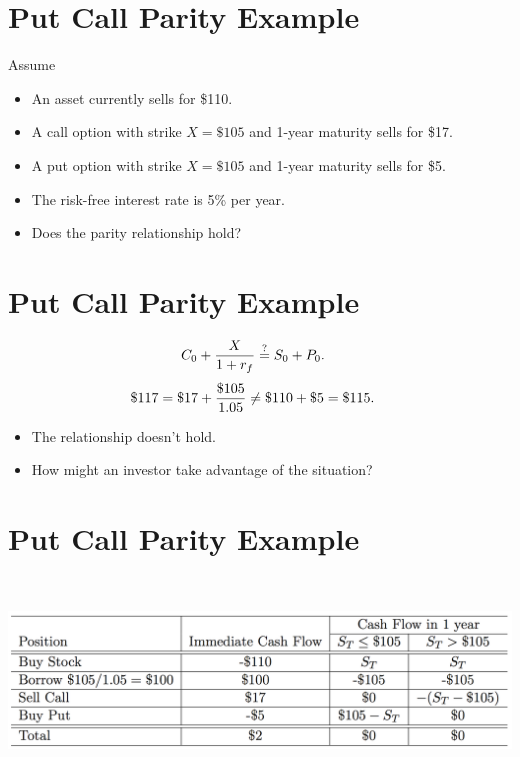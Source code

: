 \documentclass[letterpaper,10pt,english]{sphinxmanual}
\begin{document}
\section{Put Call Parity Example}
\label{options:put-call-parity-example}
Assume
\begin{itemize}
\item {} 
An asset currently sells for \$110.

\end{itemize}
\begin{itemize}
\item {} 
A call option with strike $X = \$105$ and 1-year maturity
sells for \$17.

\end{itemize}
\begin{itemize}
\item {} 
A put option with strike $X = \$105$ and 1-year maturity
sells for \$5.

\end{itemize}
\begin{itemize}
\item {} 
The risk-free interest rate is 5\% per year.

\end{itemize}
\begin{itemize}
\item {} 
Does the parity relationship hold?

\end{itemize}


\section{Put Call Parity Example}
\label{options:id25}\begin{gather}
\begin{split}C_0 + \frac{X}{1+r_f} & \stackrel{?}{=} S_0 + P_0.\end{split}\notag
\end{gather}\begin{gather}
\begin{split}\$117 = \$17 + \frac{\$105}{1.05} & \neq \$110 + \$5 = \$115.\end{split}\notag
\end{gather}\begin{itemize}
\item {} 
The relationship doesn't hold.

\end{itemize}
\begin{itemize}
\item {} 
How might an investor take advantage of the situation?

\end{itemize}


\section{Put Call Parity Example}
\label{options:id26}
$\qquad$

{\hfill\includegraphics[width=7in]{table8.png}\hfill}



\renewcommand{\indexname}{Index}
\printindex
\end{document}
